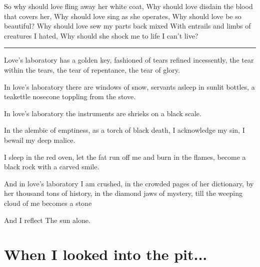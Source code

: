 \documentclass[english,11pt,letterpaper,onecolumn]{scrbook}
\begin{document}
\begin{poem}
\begin{stanza}
So why should love fling away her white coat,\verseline
Why should love disdain the blood that covers her,\verseline
Why should love sing as she operates,\verseline
Why should love be so beautiful?\verseline
Why should love sew my parts back mixed\verseline
With entrails and limbs of creatures I hated,\verseline
Why should she shock me to life I can't live?
\end{stanza}

\begin{center}\rule[3pt]{2in}{0.5pt}\end{center}

\begin{stanza}
Love's laboratory has a golden key, fashioned of tears refined incessently, the tear within the tears, the tear of repentance, the tear of glory.
\end{stanza}

\begin{stanza}
In love's laboratory there are windows of snow, servants asleep in sunlit bottles, a teakettle nosecone toppling from the stove.
\end{stanza}

\begin{stanza}
In love's laboratory the instruments are shrieks on a black scale.
\end{stanza}

\begin{stanza}
In the alembic of emptiness, as a torch of black death, I acknowledge my sin, I bewail my deep malice.
\end{stanza}

\begin{stanza}
I sleep in the red oven, let the fat run off me and burn in the flames, become a black rock with a carved smile.
\end{stanza}

\begin{stanza}
And in love's laboratory I am crushed, in the crowded pages of her dictionary, by her thousand tons of history, in the diamond jaws of mystery, till the weeping cloud of me becomes a stone
\end{stanza}

\begin{stanza}
And I reflect\verseline
The sun alone.
\end{stanza}
\attribution{}
\end{poem}

\section{When I looked into the pit...}
\end{document}
